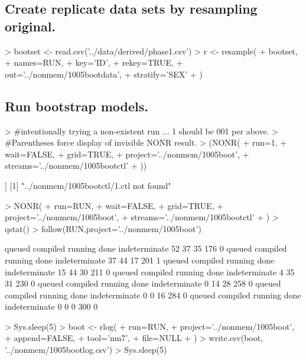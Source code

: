 \subsection{Create replicate data sets by resampling original.}
\begin{Schunk}
\begin{Sinput}
>  bootset <- read.csv('../data/derived/phase1.csv')
>  r <- resample(
+  	bootset,
+  	names=RUN,
+  	key='ID',
+  	rekey=TRUE,
+  	out='../nonmem/1005bootdata',
+  	stratify='SEX'
+  )
\end{Sinput}
\end{Schunk}
\subsection{Run bootstrap models.}
\begin{Schunk}
\begin{Sinput}
> #intentionally trying a non-existent run ... 1 should be 001 per above. 
> #Parentheses force display of invisible NONR result.
> (NONR(
+      run=1,
+      wait=FALSE,
+      grid=TRUE,
+      project='../nonmem/1005boot',
+      streams='../nonmem/1005bootctl'
+ ))
\end{Sinput}
\begin{Soutput}
[[1]]
[1] "../nonmem/1005bootctl/1.ctl not found"
\end{Soutput}
\begin{Sinput}
> NONR(
+      run=RUN,
+      wait=FALSE,
+      grid=TRUE,
+      project='../nonmem/1005boot',
+      streams='../nonmem/1005bootctl'
+ )
> qstat()
> follow(RUN,project='../nonmem/1005boot')
\end{Sinput}
\begin{Soutput}
       queued      compiled       running          done indeterminate 
           52            37            35           176             0 
       queued      compiled       running          done indeterminate 
           37            44            17           201             1 
       queued      compiled       running          done indeterminate 
           15            44            30           211             0 
       queued      compiled       running          done indeterminate 
            4            35            31           230             0 
       queued      compiled       running          done indeterminate 
            0            14            28           258             0 
       queued      compiled       running          done indeterminate 
            0             0            16           284             0 
       queued      compiled       running          done indeterminate 
            0             0             0           300             0 
\end{Soutput}
\begin{Sinput}
> Sys.sleep(5)
> boot <- rlog(
+ 	run=RUN,
+ 	project='../nonmem/1005boot',
+ 	append=FALSE,
+ 	tool='nm7',
+   file=NULL
+ )
> write.csv(boot, '../nonmem/1005bootlog.csv')
> Sys.sleep(5)
\end{Sinput}
\end{Schunk}
